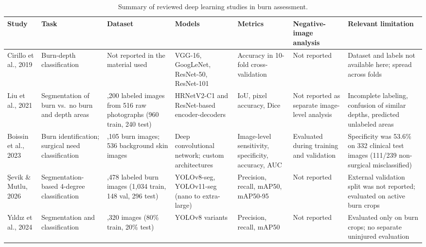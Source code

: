 \documentclass[11pt,a4paper]{article}
\begin{document}
\begin{table}[htbp]
\setlength{\tabcolsep}{3pt}
\centering
\caption{Summary of reviewed deep learning studies in burn assessment.}
\label{tab:table1}
\footnotesize
\small

\begin{tabularx}{\textwidth}{>{\raggedright\arraybackslash}p{1.9cm} >{\raggedright\arraybackslash}p{2.1cm} >{\raggedright\arraybackslash}X >{\raggedright\arraybackslash}p{2.1cm} >{\raggedright\arraybackslash}p{1.8cm} >{\raggedright\arraybackslash}p{1.9cm} >{\raggedright\arraybackslash}X}\toprule
\textbf{Study} & \textbf{Task} & \textbf{Dataset} & \textbf{Models} & \textbf{Metrics} & \textbf{Negative-image analysis} & \textbf{Relevant limitation} \\
\midrule
Cirillo et al., 2019 \cite{cirillo2019} & Burn-depth classification & Not reported in the material used & VGG-16, GoogLeNet, ResNet-50, ResNet-101 & Accuracy in 10-fold cross-validation & Not reported & Dataset and labels not available here; spread across folds \\
\addlinespace
Liu et al., 2021 \cite{liu2021} & Segmentation of burn vs.\ no burn and depth areas & 1,200 labeled images from 516 raw photographs (960 train, 240 test) & HRNetV2-C1 and ResNet-based encoder-decoders & IoU, pixel accuracy, Dice & Not reported as separate image-level analysis & Incomplete labeling, confusion of similar depths, predicted unlabeled areas \\
\addlinespace
Boissin et al., 2023 \cite{boissin2023} & Burn identification; surgical need classification & 1,105 burn images; 536 background skin images & Deep convolutional network; custom architectures & Image-level sensitivity, specificity, accuracy, AUC & Evaluated during training and validation & Specificity was 53.6\% on 332 clinical test images (111/239 non-surgical misclassified) \\
\addlinespace
\c{S}evik \& Mutlu, 2026 \cite{sevik2026} & Segmentation-based 4-degree classification & 1,478 labeled burn images (1,034 train, 148 val, 296 test) & YOLOv8-seg, YOLOv11-seg (nano to extra-large) & Precision, recall, mAP50, mAP50-95 & Not reported & External validation split was not reported; evaluated on active burn crops \\
\addlinespace
Y\i ld\i z et al., 2024 \cite{yildiz2024} & Segmentation and classification & 1,320 images (80\% train, 20\% test) & YOLOv8 variants & Precision, recall, mAP50 & Not reported & Evaluated only on burn crops; no separate uninjured evaluation \\
\bottomrule
\end{tabularx}
\end{table}
\end{document}
